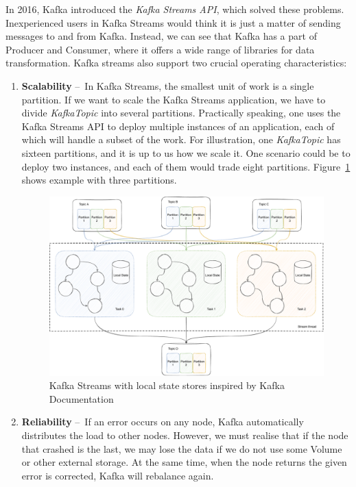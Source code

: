In 2016, Kafka introduced the \emph{Kafka Streams API}, which solved these problems.
Inexperienced users in Kafka Streams would think it is just a matter of sending messages to and from Kafka.
Instead, we can see that Kafka has a part of Producer and Consumer, where it offers a wide range of libraries for data transformation.
Kafka streams also support two crucial operating characteristics:
\begin{enumerate}[itemsep=1mm, parsep=0pt]
    \item \textbf{Scalability} \---\ In Kafka Streams, the smallest unit of work is a single partition.
    If we want to scale the Kafka Streams application, we have to divide \emph{KafkaTopic} into several partitions.
    Practically speaking, one uses the Kafka Streams API to deploy multiple instances of an application, each of which will handle a subset of the work.
    For illustration, one \emph{KafkaTopic} has sixteen partitions, and it is up to us how we scale it.
    One scenario could be to deploy two instances, and each of them would trade eight partitions.
    Figure~\ref{fig:kafkaStreams} shows example with three partitions.

    \begin{figure}[!h]
        \centering
        \includegraphics[scale=0.48]{obrazky-figures/02-preliminaries/02-kafka/07-kafka-streams-with-localstate,thread.pdf}
        \caption{Kafka Streams with local state stores inspired by Kafka Documentation~\cite{kafkaDocumentation}}
        \label{fig:kafkaStreams}
    \end{figure}


    \item \textbf{Reliability} \---\ If an error occurs on any node, Kafka automatically distributes the load to other nodes.
    However, we must realise that if the node that crashed is the last, we may lose the data if we do not use some Volume or other external storage.
    At the same time, when the node returns the given error is corrected, Kafka will rebalance again.
\end{enumerate}

